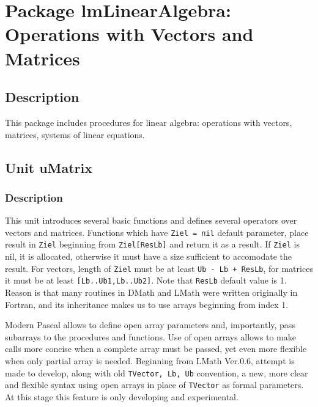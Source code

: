 \documentclass[12pt,a4paper,oneside]{report}
\newcommand{\lmatha}[1]{   %
	\marginpar{\vspace{#1} 
		\begin{flushright}
			LMath 0.5
	\end{flushright} }
}
\newcommand{\lmathsix}[1]{   %
	\marginpar{\vspace{#1} 
		\begin{flushright}
			LMath 0.6
	\end{flushright} }
}
\newcommand{\code}[1]{\texttt{#1}}
\begin{document}
\chapter[Package lmLinearAlgebra]{Package lmLinearAlgebra: Operations with Vectors and Matrices}\label{package-lmLinearAlgebra}
\section{Description}
This package includes procedures for linear algebra: operations with vectors, matrices, systems of linear equations.
\section{Unit uMatrix}\label{sec:unit-umatrix}
\lmatha{-28pt}
\lmathsix{-12pt}
\label{umatrix} 
\subsection{Description}
This unit introduces several basic functions  and defines several operators over vectors and matrices.  Functions which have \code{Ziel = nil} default parameter, place result in \code{Ziel} beginning from \code{Ziel[ResLb]} and return it as a result. If \code{Ziel} is nil, it is allocated, otherwise it must have a size sufficient to accomodate the result. For vectors, length of \code{Ziel} must be at least \code{Ub - Lb + ResLb}, for matrices it must be at least \code{[Lb..Ub1,Lb..Ub2]}. Note that \code{ResLb} default value is 1. Reason is that many routines in DMath and LMath were written originally in Fortran, and its inheritance makes us to use arrays beginning from index 1. 

Modern Pascal allows to define open array parameters and, importantly, pass subarrays to the procedures and functions. Use of open arrays allows to make calls more concise when a complete array must be passed, yet even more flexible when only partial array is needed. Beginning from LMath Ver.0.6, attempt is made to develop, along with old \code{TVector, Lb, Ub} convention, a new, more clear and flexible syntax using open arrays in place of \code{TVector} as formal parameters. At this stage this feature is only developing and experimental.
\end{document}
